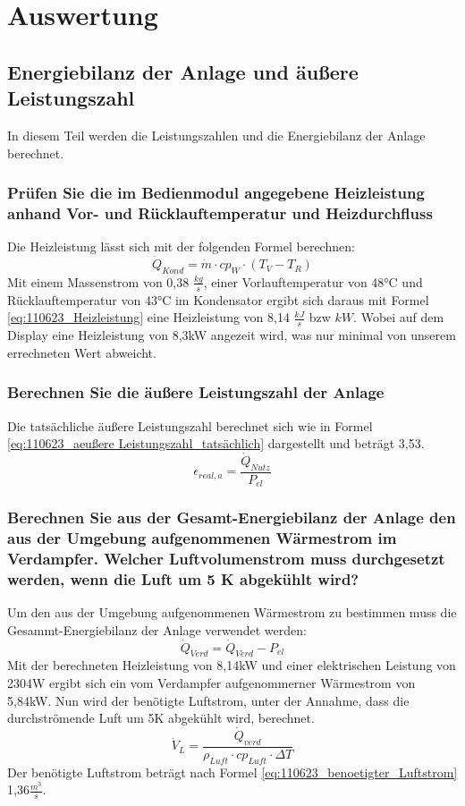 \newpage
\section{Auswertung}
\label{sec:Auswertung}
\subsection{Energiebilanz der Anlage und äußere Leistungszahl}
In diesem Teil werden die Leistungszahlen und die Energiebilanz der Anlage berechnet.
\subsubsection{Prüfen Sie die im Bedienmodul angegebene Heizleistung anhand Vor- und Rücklauftemperatur und Heizdurchfluss}
Die Heizleistung lässt sich mit der folgenden Formel berechnen:
\begin{equation}
\dot Q_{Kond}= \dot m \cdot cp_{W} \cdot (T_{V} - T_{R})
\label{eq:110623_Heizleistung}
\end{equation}
Mit einem Massenstrom von 0,38 $\frac{kg}{s}$, einer Vorlauftemperatur von 48°C und Rücklauftemperatur von 43°C im Kondensator ergibt sich daraus mit Formel \ref{eq:110623_Heizleistung} eine Heizleistung von 8,14 $\frac{kJ}{s}$ bzw $kW$. Wobei auf dem Display eine Heizleistung von 8,3kW angezeit wird, was nur minimal von unserem errechneten Wert abweicht.
\subsubsection{Berechnen Sie die äußere Leistungszahl der Anlage}
Die tatsächliche äußere Leistungszahl berechnet sich wie in Formel \ref{eq:110623_aeußere Leistungszahl_tatsächlich} dargestellt und beträgt 3,53.
\begin{equation}
\epsilon_{real,a} = \frac{\dot Q_{Nutz}}{P_{el}}
\label{eq:110623_aeußere Leistungszahl_tatsächlich}
\end{equation}
\subsubsection{Berechnen Sie aus der Gesamt-Energiebilanz der Anlage den aus der Umgebung aufgenommenen Wärmestrom im Verdampfer.
Welcher Luftvolumenstrom muss durchgesetzt werden, wenn die Luft um 5 K abgekühlt wird?}
Um den aus der Umgebung aufgenommenen Wärmestrom zu bestimmen muss die Gesammt-Energiebilanz der Anlage verwendet werden:
\begin{equation}
\dot Q_{Verd}=\dot Q_{Verd}-P_{el}
\label{eq:110623_aeußere Leistungszahl}
\end{equation}
Mit der berechneten Heizleistung von 8,14kW und einer elektrischen Leistung von 2304W ergibt sich ein vom Verdampfer aufgenommerner Wärmestrom von 5,84kW. Nun wird der benötigte Luftstrom, unter der Annahme, dass die durchströmende Luft um 5K abgekühlt wird, berechnet.
\begin{equation}
\dot V_{L}=\frac{\dot Q_{verd}}{\rho_{Luft} \cdot cp_{Luft} \cdot \Delta T}
\label{eq:110623_benoetigter_Luftstrom}
\end{equation}
Der benötigte Luftstrom beträgt nach Formel \ref{eq:110623_benoetigter_Luftstrom} 1,36$\frac{m^3}{s}$. 
